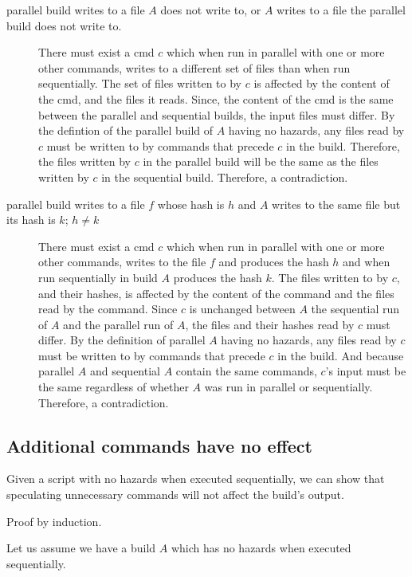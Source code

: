\begin{description}
\item [parallel build writes to a file $A$ does not write to, or $A$ writes to a file the parallel build does not write to.]
  There must exist a cmd $c$ which when run in parallel with one or more other commands, writes to a different set of files than when run sequentially.  The set of files written to by $c$ is affected by the content of the cmd, and the files it reads.  Since, the content of the cmd is the same between the parallel and sequential builds, the input files must differ.
  By the defintion of the parallel build of $A$ having no hazards, any files read by $c$ must be written to by commands that precede $c$ in the build.  Therefore, the files written by $c$ in the parallel build will be the same as the files written by $c$ in the sequential build.  Therefore, a contradiction.

  
\item [parallel build writes to a file $f$ whose hash is $h$ and $A$ writes to the same file but its hash is $k$; $h \neq k$]
  There must exist a cmd $c$ which when run in parallel with one or more other commands, writes to the file $f$ and produces the hash $h$ and when run sequentially in build $A$ produces the hash $k$.
  The files written to by $c$, and their hashes, is affected by the content of the command and the files read by the command.  Since $c$ is unchanged between $A$ the sequential run of $A$ and the parallel run of $A$, the files and their hashes read by $c$ must differ.  By the definition of parallel $A$ having no hazards, any files read by $c$ must be written to by commands that precede $c$ in the build.  And because parallel $A$ and sequential $A$ contain the same commands, $c$'s input must be the same regardless of whether $A$ was run in parallel or sequentially.  Therefore, a contradiction.

\end{description}

\subsection{Additional commands have no effect}
\label{sec:proof:additional}

Given a script with no hazards when executed sequentially, we can show that speculating unnecessary commands will not affect the build's output. %

Proof by induction.

Let us assume we have a build $A$ which has no hazards when executed sequentially.

